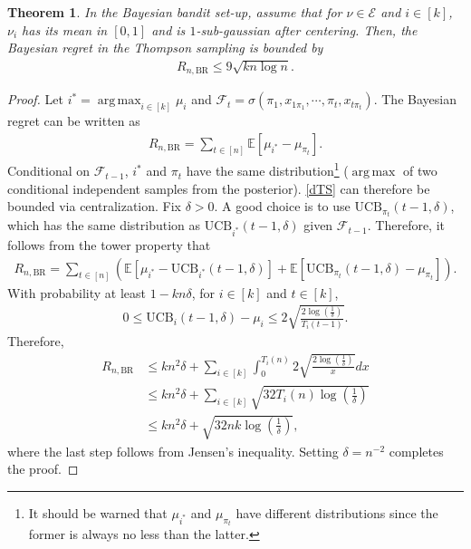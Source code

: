 \documentclass[letterpaper,10pt,openright,openany]{book}
\numberwithin{equation}{section}
\theoremstyle{plain}
\newtheorem{Th}{Theorem}[section]
\theoremstyle{definition}
\def\E{{\mathbb E}}
\def\BR{{\text{BR}}}
\DeclareMathOperator*{\argmax}{arg\,max}
\begin{document}
\begin{Th}
In the Bayesian bandit set-up, assume that for $\nu\in\mathcal E$ and $i\in [k]$, $\nu_i$ has its mean in $[0,1]$ and is $1$-sub-gaussian after centering. Then, the Bayesian regret in the Thompson sampling is bounded by
\begin{align*}
R_{n,\BR}\leq 9\sqrt{kn\log n}. 
\end{align*}
\end{Th}

\begin{proof}
Let $i^*=\argmax_{i\in [k]}\mu_i$ and $\mathcal F_t = \sigma(\pi_1, x_{1\pi_1},\cdots, \pi_t, x_{t\pi_t})$. The Bayesian regret can be written as
\begin{align}
R_{n, \BR} = \sum_{t\in [n]}\E[\mu_{i^*}-\mu_{\pi_t}]. \label{dTS}
\end{align}
Conditional on $\mathcal F_{t-1}$, $i^*$ and $\pi_t$ have the same distribution\footnote{It should be warned that $\mu_{i^*}$ and $\mu_{\pi_t}$ have different distributions since the former is always no less than the latter.} ($\argmax$ of two conditional independent samples from the posterior). \eqref{dTS} can therefore be bounded via centralization. Fix $\delta>0$. A good choice is to use $\text{UCB}_{\pi_t}(t-1,\delta)$, which has the same distribution as $\text{UCB}_{i^*}(t-1,\delta)$ given $\mathcal F_{t-1}$.  Therefore, it follows from the tower property that
\begin{align*}
R_{n, \BR} =  \sum_{t\in [n]}\left(\E[\mu_{i^*}-\text{UCB}_{i^*}(t-1,\delta)]+\E[\text{UCB}_{\pi_t}(t-1,\delta)-\mu_{\pi_t}]\right).
\end{align*}
With probability at least $1-kn\delta$, for $i\in [k]$ and $t\in [k]$,
\begin{align*}
0\leq \text{UCB}_{i}(t-1,\delta)-\mu_{i}\leq 2\sqrt{\frac{2\log\left(\frac{1}{\delta}\right)}{T_i(t-1)}}.
\end{align*}
Therefore,
\begin{align*}
R_{n,\BR}&\leq kn^2\delta + \sum_{i\in [k]}\int_{0}^{T_{i}(n)}2\sqrt{\frac{2\log\left(\frac{1}{\delta}\right)}{x}}dx\\
&\leq kn^2\delta + \sum_{i\in [k]}\sqrt{32T_i(n)\log\left(\frac{1}{\delta}\right)}\\
&\leq kn^2\delta+\sqrt{32nk\log\left(\frac{1}{\delta}\right)},
\end{align*}
where the last step follows from Jensen's inequality. Setting $\delta=n^{-2}$ completes the proof. 
\end{proof}
\end{document}

